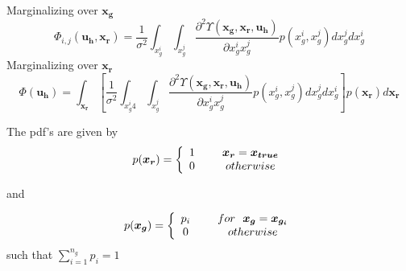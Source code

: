 \documentclass[]{article}
\begin{document}
Marginalizing over $\boldsymbol{x_g}$
\begin{equation*}
\Phi_{i,j}(\boldsymbol{u_h}, \boldsymbol{x_r}) =
\frac{1}{\sigma^2}\int_{x_g^i}\int_{x_g^j}\frac{\partial^2\Upsilon(\boldsymbol{x_g}, \boldsymbol{x_r}, \boldsymbol{u_h})}{\partial x_g^ix_g^j}p(x_g^i, x_g^j)dx_g^jdx_g^i
\end{equation*}
Marginalizing over $\boldsymbol{x_r}$
\begin{equation*}
\Phi(\boldsymbol{u_h}) = \int_{\boldsymbol{x_r}}\left[\frac{1}{\sigma^2}\int_{x_g^i4}\int_{x_g^j}\frac{\partial^2\Upsilon(\boldsymbol{x_g}, \boldsymbol{x_r}, \boldsymbol{u_h})}{\partial x_g^ix_g^j}p(x_g^i, x_g^j)dx_g^jdx_g^i\right]p(\boldsymbol{x_r})d\boldsymbol{x_r}
\end{equation*}

The pdf's are given by
\begin{align*}
p(\boldsymbol{x_r}) = \left\{ 
\begin{array}{cc} 
1 & \hspace{5mm} \boldsymbol{x_r}=\boldsymbol{x_{true}} \\
0 & \hspace{5mm} otherwise
\end{array}\right. 
\end{align*}

and

\begin{align*}
p(\boldsymbol{x_g}) = \left\{ 
\begin{array}{cc} 
p_i & \hspace{5mm} for ~~ \boldsymbol{x_g} = \boldsymbol{x_{g_i}} \\
0 & \hspace{5mm} otherwise
\end{array}\right. 
\end{align*}
such that $\sum_{i=1}^{n_g} p_i = 1$
\end{document}
